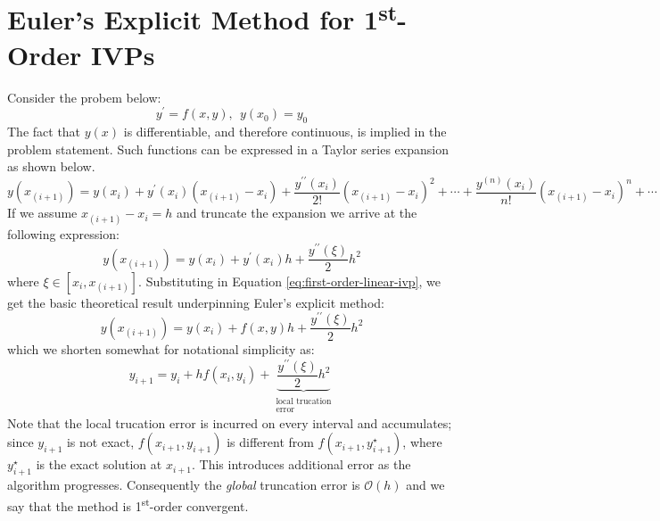\section{Euler's Explicit Method for 1\textsuperscript{st}-Order IVPs}

Consider the probem below:
\begin{equation}
y^{\prime} = f(x,y), \ \ y(x_0) = y_0
\label{eq:first-order-linear-ivp}
\end{equation}
The fact that $y(x)$ is differentiable, and therefore continuous, is implied in the problem statement.  Such functions can be expressed in a Taylor series expansion as shown below.
\begin{equation*}
y(x_{(i+1)}) = y(x_{i}) + y^{\prime}(x_i)(x_{(i+1)}-x_i) + \frac{y^{\prime \prime}(x_{i})}{2!}(x_{(i+1)}-x_i)^2 + \cdots + \frac{y^{(n)}(x_i)}{n!}(x_{(i+1)}-x_i)^n + \cdots
\end{equation*}
If we assume $x_{(i+1)}-x_i = h$ and truncate the expansion we arrive at the following expression:
\begin{equation*}
y(x_{(i+1)}) = y(x_{i}) + y^{\prime}(x_i)h + \frac{y^{\prime \prime}(\xi)}{2}h^2
\end{equation*}
where $\xi \in [x_{i}, x_{(i+1)}]$.  Substituting in Equation \ref{eq:first-order-linear-ivp}, we get the basic theoretical result underpinning Euler's explicit method:
\begin{equation*}
y(x_{(i+1)}) = y(x_i)+f(x,y)h + \frac{y^{\prime \prime}(\xi)}{2}h^2
\end{equation*}
which we shorten somewhat for notational simplicity as:
\begin{equation}
y_{i+1} = y_i + hf(x_i,y_i) + \underbrace{\frac{y^{\prime \prime}(\xi)}{2}h^2}_{\substack{\text{local trucation} \\ \text{error}}}
\end{equation}
Note that the local trucation error is incurred on every interval and accumulates; since $y_{i+1}$ is not exact, $f(x_{i+1},y_{i+1})$ is different from $f(x_{i+1},y^{\star}_{i+1})$, where $y^{\star}_{i+1}$ is the exact solution at $x_{i+1}$.  This introduces additional error as the algorithm progresses. Consequently the \emph{global} truncation error is $\mathcal{O}(h)$ and we say that the method is 1\textsuperscript{st}-order convergent.

\vspace{0.2cm}

